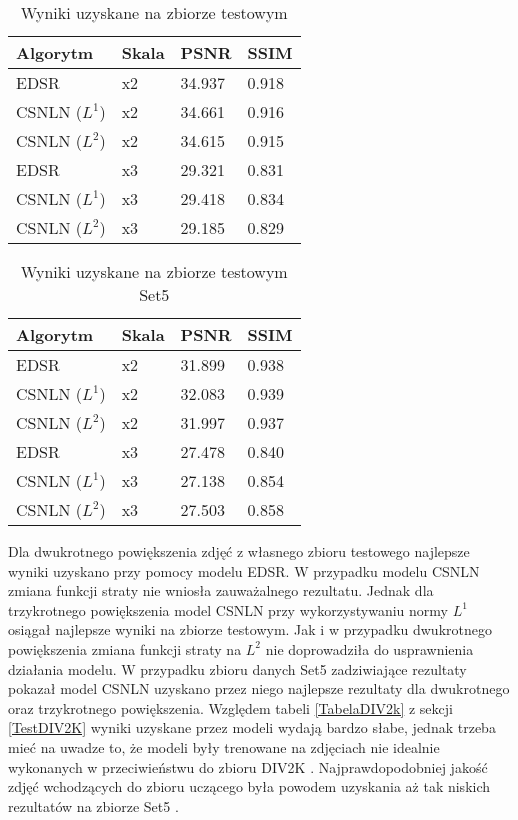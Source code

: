 \documentclass[a4paper,12pt,twoside,openany]{report}
\begin{document}
	\begin{table}[!htbp] 
		\centering
		\begin{tabular}{ |p{3cm}||p{2cm}|p{2cm}|p{2cm}|  }
			\hline
			Algorytm 							      & Skala   & PSNR      & SSIM \\
			\hline
			EDSR                                      &   x2	& 34.937	& 0.918\\
			CSNLN  ($L^1$)  						  &   x2	& 34.661	& 0.916\\
			CSNLN ($L^2$)  							  &   x2	& 34.615	& 0.915\\
			\hline
			EDSR                                      &   x3	& 29.321	& 0.831\\
			CSNLN ($L^1$) 						      &   x3	& 29.418	& 0.834\\
			CSNLN ($L^2$)  							  &   x3	& 29.185	& 0.829\\
			\hline
			
		\end{tabular}
		\caption{Wyniki uzyskane na zbiorze testowym}
		\label{TabelaShumAndNormal}
	\end{table}
	\begin{table}[!htbp] 
		\centering
		\begin{tabular}{ |p{3cm}||p{2cm}|p{2cm}|p{2cm}|  }
			\hline
			Algorytm 							      & Skala   & PSNR      & SSIM \\
			\hline
			EDSR                                      &   x2	& 31.899	& 0.938\\
			CSNLN  ($L^1$)  						  &   x2	& 32.083	& 0.939\\
			CSNLN ($L^2$)  							  &   x2	& 31.997	& 0.937\\
			\hline
			EDSR                                      &   x3	& 27.478	& 0.840\\
			CSNLN ($L^1$) 						      &   x3	& 27.138	& 0.854\\
			CSNLN ($L^2$)  							  &   x3	& 27.503	& 0.858\\
			\hline
			
		\end{tabular}
		\caption{Wyniki uzyskane na zbiorze testowym Set5}
		\label{TabelaShumAndNormalSet5}
	\end{table}

	Dla dwukrotnego powiększenia zdjęć z własnego zbioru testowego najlepsze wyniki uzyskano przy pomocy modelu EDSR. W przypadku modelu CSNLN zmiana funkcji straty nie wniosła zauważalnego rezultatu. Jednak dla trzykrotnego powiększenia model CSNLN przy wykorzystywaniu normy $L^1$ osiągał najlepsze wyniki na zbiorze testowym. Jak i w przypadku dwukrotnego powiększenia zmiana funkcji straty na $L^2$ nie doprowadziła do usprawnienia działania modelu.
	\newpage
	W przypadku zbioru danych Set5 \cite{Set5} zadziwiające rezultaty pokazał model CSNLN uzyskano przez niego najlepsze rezultaty dla dwukrotnego oraz trzykrotnego powiększenia. Względem tabeli \ref{TabelaDIV2k} z sekcji \ref{TestDIV2K} wyniki uzyskane przez modeli wydają bardzo słabe, jednak trzeba mieć na uwadze to, że modeli były trenowane na zdjęciach nie idealnie wykonanych w przeciwieństwu do zbioru DIV2K \cite{DIV2K}. Najprawdopodobniej jakość zdjęć wchodzących do zbioru uczącego była powodem uzyskania aż tak niskich rezultatów na zbiorze Set5 \cite{Set5}.
	
\end{document}
